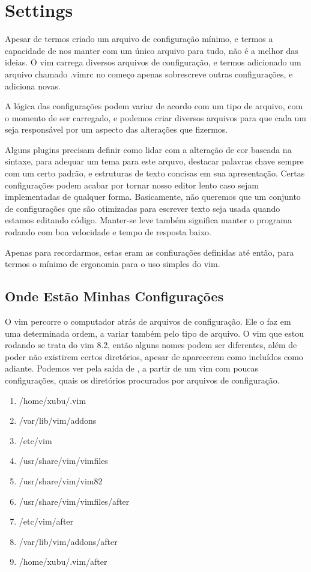 \chapter{Settings}
Apesar de termos criado um arquivo de configuração mínimo,
e termos a capacidade de nos manter com um único arquivo para tudo, não é a melhor das ideias.
O vim carrega diversos arquivos de configuração, e termos adicionado um arquivo chamado .vimrc no começo apenas
sobrescreve outras configurações, e adiciona novas.

A lógica das configurações podem variar de acordo com um tipo de arquivo,
com o momento de ser carregado, e podemos criar diversos arquivos para que cada
um seja responsável por um aspecto das alterações que fizermos.

Alguns plugins precisam definir como lidar com a alteração de cor baseada na sintaxe,
para adequar um tema para este arquvo, destacar palavras chave sempre com um certo padrão,
e estruturas de texto concisas em sua apresentação.
Certas configurações podem acabar por tornar nosso editor lento caso sejam implementadas de qualquer forma.
Basicamente, não queremos que um conjunto de configurações que são otimizadas para escrever texto seja usada 
quando estamos editando código.
Manter-se leve também significa manter o programa rodando com boa velocidade e tempo de resposta baixo.

Apenas para recordarmos, estas eram as confiurações definidas até então, para termos o mínimo de ergonomia para o uso simples do vim.



\section{Onde Estão Minhas Configurações}
O vim percorre o computador atrás de arquivos de configuração.
Ele o faz em uma determinada ordem, a variar também pelo tipo de arquivo.
O vim que estou rodando se trata do vim 8.2, então alguns nomes podem ser diferentes,
além de poder não existirem certos diretórios, apesar de aparecerem como incluídos como adiante.
Podemos ver pela saída de , a partir de um vim com poucas configurações,
quais os diretórios procurados por arquivos de configuração.
\begin{multicols}{2}
\begin{enumerate}
	\item /home/xubu/.vim
	\item /var/lib/vim/addons
	\item /etc/vim
	\item /usr/share/vim/vimfiles
	\item /usr/share/vim/vim82
	\item /usr/share/vim/vimfiles/after
	\item /etc/vim/after
	\item /var/lib/vim/addons/after
	\item /home/xubu/.vim/after
\end{enumerate}
\end{multicols}

